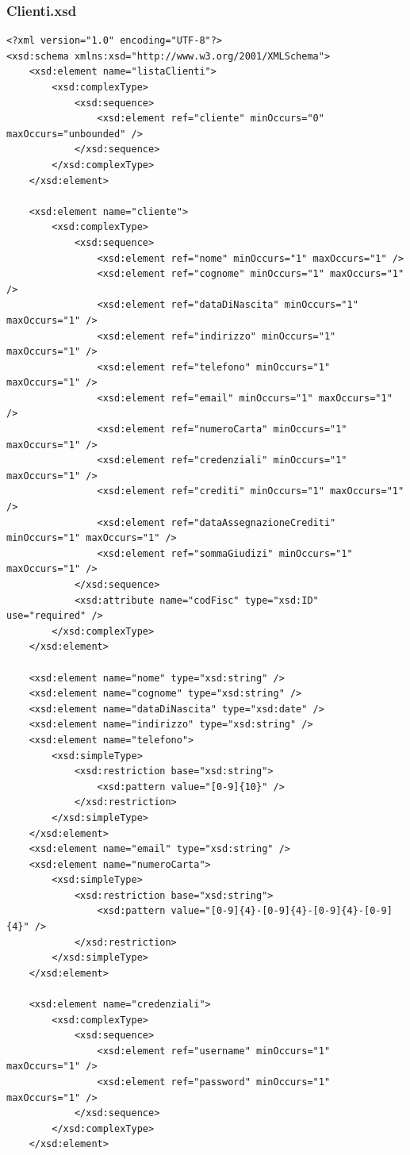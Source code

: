 \documentclass [a4paper, 12pt]{book}
\begin{document}
\subsubsection{Clienti.xsd}
\begin{lstlisting}[style=XML]
<?xml version="1.0" encoding="UTF-8"?>
<xsd:schema xmlns:xsd="http://www.w3.org/2001/XMLSchema">
    <xsd:element name="listaClienti">
        <xsd:complexType>
            <xsd:sequence>
                <xsd:element ref="cliente" minOccurs="0" maxOccurs="unbounded" />
            </xsd:sequence>
        </xsd:complexType>
    </xsd:element>

    <xsd:element name="cliente">
        <xsd:complexType>
            <xsd:sequence>
                <xsd:element ref="nome" minOccurs="1" maxOccurs="1" />
                <xsd:element ref="cognome" minOccurs="1" maxOccurs="1" />
                <xsd:element ref="dataDiNascita" minOccurs="1" maxOccurs="1" />
                <xsd:element ref="indirizzo" minOccurs="1" maxOccurs="1" />
                <xsd:element ref="telefono" minOccurs="1" maxOccurs="1" />
                <xsd:element ref="email" minOccurs="1" maxOccurs="1" />
                <xsd:element ref="numeroCarta" minOccurs="1" maxOccurs="1" />
                <xsd:element ref="credenziali" minOccurs="1" maxOccurs="1" />
                <xsd:element ref="crediti" minOccurs="1" maxOccurs="1" />
                <xsd:element ref="dataAssegnazioneCrediti" minOccurs="1" maxOccurs="1" />
                <xsd:element ref="sommaGiudizi" minOccurs="1" maxOccurs="1" />
            </xsd:sequence>
            <xsd:attribute name="codFisc" type="xsd:ID"  use="required" />
        </xsd:complexType>
    </xsd:element>

    <xsd:element name="nome" type="xsd:string" />
    <xsd:element name="cognome" type="xsd:string" />
    <xsd:element name="dataDiNascita" type="xsd:date" />
    <xsd:element name="indirizzo" type="xsd:string" />
    <xsd:element name="telefono">
        <xsd:simpleType>
            <xsd:restriction base="xsd:string">
                <xsd:pattern value="[0-9]{10}" />
            </xsd:restriction>
        </xsd:simpleType>
    </xsd:element>
    <xsd:element name="email" type="xsd:string" />
    <xsd:element name="numeroCarta">
        <xsd:simpleType>
            <xsd:restriction base="xsd:string">
                <xsd:pattern value="[0-9]{4}-[0-9]{4}-[0-9]{4}-[0-9]{4}" />
            </xsd:restriction>
        </xsd:simpleType>
    </xsd:element>

    <xsd:element name="credenziali">
        <xsd:complexType>
            <xsd:sequence>
                <xsd:element ref="username" minOccurs="1" maxOccurs="1" />
                <xsd:element ref="password" minOccurs="1" maxOccurs="1" />
            </xsd:sequence>
        </xsd:complexType>
    </xsd:element>


\end{lstlisting}
\end{document}
